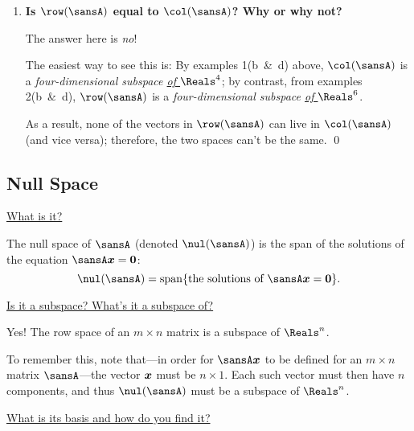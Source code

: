 \documentclass[12 pt]{article}
\begin{document}
{\begin{enumerate}[label=(\alph*),itemsep=6mm,listparindent=6mm,leftmargin=6mm]
		Alternatively, we could have used \textbf{} above to conclude the same result: $\rank(\sansA)=4=\dim(\row(\sansA))=\dim(\col(\sansA))$. The purpose of this exercise is for you to confirm that for this particular example.\qed
		
		\item \textbf{Is $\row(\sansA)$ equal to $\col(\sansA)$? Why or why not?}
		
		\ans The answer here is \textit{no}!
		
		The easiest way to see this is: By examples 1(b~\&~d) above, $\col(\sansA)$ is a \textit{four-dimensional subspace \ul{of $\Reals^4$}}; by contrast, from examples 2(b~\&~d), $\row(\sansA)$ is a \textit{four-dimensional subspace \ul{of $\Reals^6$}}. 
		
		As a result, none of the vectors in $\row(\sansA)$ can live in $\col(\sansA)$ (and vice versa); therefore, the two spaces can't be the same. \qed
	\end{enumerate}
}

\subsection*{\hspace{-6.5mm}Null Space}
\noindent\ul{What is it?}

The null space of $\sansA$ (denoted $\nul(\sansA)$) is the span of the solutions of the equation $\sansA\vect{x}=\vect{0}$: 
\begin{equation}
	\label{nullSpaceEq}\vspace{6mm}
	\nul(\sansA)=\vsspan\{\text{the solutions of $\sansA\vect{x}=\vect{0}$}\}.
\end{equation}

\vspace{-6mm}

\noindent\ul{Is it a subspace? What's it a subspace of?}

Yes! The row space of an $m\times n$ matrix is a subspace of $\Reals^n$. 

To remember this, note that---in order for $\sansA\vect{x}$ to be defined for an $m\times n$ matrix $\sansA$---the vector $\boldsymbol{x}$ must be $n\times 1$. Each such vector must then have $n$ components, and thus $\nul(\sansA)$ must be a subspace of $\Reals^n$.

\vspace{6mm}

\noindent\ul{What is its basis and how do you find it?}
\end{document}

